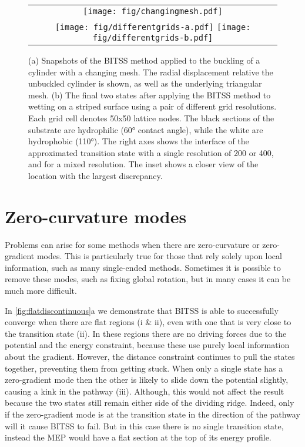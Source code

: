 \documentclass[aps,twocolumn]{revtex4}
\begin{document}
\begin{figure}[htb]
  \centering
  \begin{tabular}[b]{c}
    \texttt{[image: fig/changingmesh.pdf]}\\
    \texttt{[image: fig/differentgrids-a.pdf]}%
    \texttt{[image: fig/differentgrids-b.pdf]}%
  \end{tabular}
  \caption{
  (a) Snapshots of the BITSS method applied to the buckling of a cylinder with a changing mesh. The radial displacement relative the unbuckled cylinder is shown, as well as the underlying triangular mesh.
  (b) The final two states after applying the BITSS method to wetting on a striped surface using a pair of different grid resolutions. Each grid cell denotes 50x50 lattice nodes. The black sections of the substrate are hydrophilic (60\si{\degree} contact angle), while the white are hydrophobic (110\si{\degree}). The right axes shows the interface of the approximated transition state with a single resolution of 200 or 400, and for a mixed resolution. The inset shows a closer view of the location with the largest discrepancy.}
  \label{fig:differentgrids}
\end{figure}


\section{Zero-curvature modes}
Problems can arise for some methods when there are zero-curvature or zero-gradient modes. This is particularly true for those that rely solely upon local information, such as many single-ended methods. Sometimes it is possible to remove these modes, such as fixing global rotation, but in many cases it can be much more difficult.

In \cref{fig:flatdiscontinuous}a we demonstrate that BITSS is able to successfully converge when there are flat regions (i \& ii), even with one that is very close to the transition state (ii). In these regions there are no driving forces due to the potential and the energy constraint, because these use purely local information about the gradient. However, the distance constraint continues to pull the states together, preventing them from getting stuck. When only a single state has a zero-gradient mode then the other is likely to slide down the potential slightly, causing a kink in the pathway (iii). Although, this would not affect the result because the two states still remain either side of the dividing ridge. Indeed, only if the zero-gradient mode is at the transition state in the direction of the pathway will it cause BITSS to fail. But in this case there is no single transition state, instead the MEP would have a flat section at the top of its energy profile. 
\end{document}
